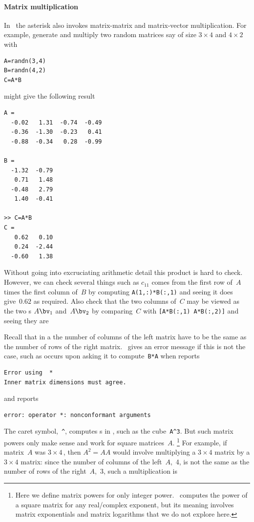 \paragraph{Matrix multiplication}
In \script\ the asterisk also invokes matrix-matrix and matrix-vector multiplication.
For example, generate and multiply two random matrices say of size \(3\times4\) and \(4\times 2\) with 
\begin{verbatim}
A=randn(3,4)
B=randn(4,2)
C=A*B
\end{verbatim}
\setbox\ajrqrbox\hbox{}%
\marginajrbox%
might give the following result \twodp\ 
\begin{verbatim}
A =
  -0.02   1.31  -0.74  -0.49
  -0.36  -1.30  -0.23   0.41
  -0.88  -0.34   0.28  -0.99

B =
  -1.32  -0.79
   0.71   1.48
  -0.48   2.79
   1.40  -0.41

>> C=A*B
C =
   0.62   0.10
   0.24  -2.44
  -0.60   1.38
\end{verbatim}
Without going into excruciating arithmetic detail this product is hard to check.
However, we can check several things such as \(c_{11}\) comes from the first row of~\(A\) times the first column of~\(B\) by computing \verb|A(1,:)*B(:,1)| and seeing it does give~\(0.62\) as required.
Also check that the two columns of~\(C\) may be viewed as the two \idx{matrix-vector product}s \(A\bv_1\) and~\(A\bv_2\) by comparing~\(C\) with \verb|[A*B(:,1) A*B(:,2)]| and seeing they are 

Recall that in a  the number of columns of the left matrix have to be the same as the number of rows of the right matrix.
\script\ gives an error message if this is not the case, such as occurs  upon asking it to compute~\verb|B*A| when \script[1] reports
\index{Error using@\texttt{Error using}}%
%
%
\begin{verbatim}
Error using  * 
Inner matrix dimensions must agree.
\end{verbatim}
and \script[2] reports
\begin{verbatim}
error: operator *: nonconformant arguments
\end{verbatim}

The caret symbol,~\verb|^|, computes s in \script, such as the cube~\verb|A^3|. 
But such matrix powers only make sense and work for square matrices~\(A\).%
\footnote{Here we define matrix powers for only integer power. \script\ computes the power of a square matrix for any real\slash complex exponent, but its meaning involves matrix exponentials and matrix logarithms that we do not explore here.}
For example, if matrix~\(A\) was \(3\times4\)\,, then \(A^2=AA\) would involve multiplying a \(3\times4\) matrix by a \(3\times4\) matrix: since the number of columns of the left~\(A\),~4, is not the same as the number of rows of the right~\(A\),~3, such a multiplication is 



